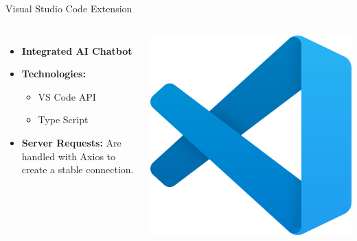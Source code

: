 \documentclass{beamer}
\begin{document}
\begin{frame}{Visual Studio Code Extension}
  \begin{columns}
      \begin{itemize}
        \item \textbf{Integrated AI Chatbot}
        \item \textbf{Technologies:}
        \begin{itemize}
          \item VS Code API
          \item Type Script
        \end{itemize}
        \item \textbf{Server Requests:}  Are handled with Axios to create a stable connection.
      \end{itemize}
      \centering
      \includegraphics[width=\textwidth]{VSCode.png}
  \end{columns}
\end{frame}
\end{document}
